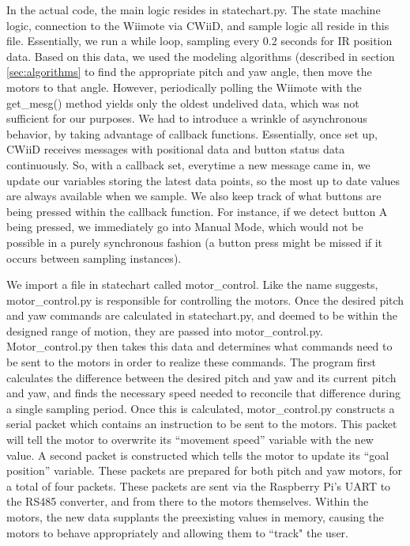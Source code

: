\documentclass[conference, twocolumn]{IEEEtran}
\begin{document}
In the actual code, the main logic resides in statechart.py. The state machine logic, connection to the Wiimote via CWiiD, and sample logic all reside in this file. Essentially, we run a while loop, sampling every 0.2 seconds for IR position data. Based on this data, we used the modeling algorithms (described in section \ref{sec:algorithms} to find the appropriate pitch and yaw angle, then move the motors to that angle. However, periodically polling the Wiimote with the get\_mesg() method yields only the oldest undelived data, which was not sufficient for our purposes. We had to introduce a wrinkle of asynchronous behavior, by taking advantage of callback functions. Essentially, once set up, CWiiD receives messages with positional data and button status data continuously. So, with a callback set, everytime a new message came in, we update our variables storing the latest data points, so the most up to date values are always available when we sample. We also keep track of what buttons are being pressed within the callback function. For instance, if we detect button A being pressed, we immediately go into Manual Mode, which would not be possible in a purely synchronous fashion (a button press might be missed if it occurs between sampling instances). 

We import a file in statechart called motor\_control. Like the name suggests, motor\_control.py is responsible for controlling the motors. Once the desired pitch and yaw commands are calculated in statechart.py, and deemed to be within the designed range of motion, they are passed into motor\_control.py. Motor\_control.py then takes this data and determines what commands need to be sent to the motors in order to realize these commands. The program first calculates the difference between the desired pitch and yaw and its current pitch and yaw, and finds the necessary speed needed to reconcile that difference during a single sampling period. Once this is calculated, motor\_control.py constructs a serial packet which contains an instruction to be sent to the motors. This packet will tell the motor to overwrite its ``movement speed'' variable with the new value. A second packet is constructed which tells the motor to update its ``goal position'' variable. These packets are prepared for both pitch and yaw motors, for a total of four packets. These packets are sent via the Raspberry Pi's UART to the RS485 converter, and from there to the motors themselves. Within the motors, the new data supplants the preexisting values in memory, causing the motors to behave appropriately and allowing them to ``track" the user.
\end{document}
